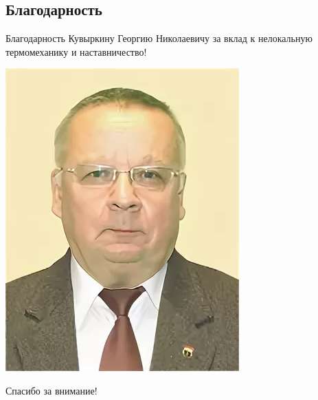 \subsection{Благодарность}
\begin{frame}{Благодарность}
	\justifying
	Кувыркину Георгию Николаевичу за вклад к нелокальную термомеханику и наставничество!
	\begin{center}
		\includegraphics[height=0.65\textheight]{pics/Kuvyrkin.png}
	\end{center}
\end{frame}

\begin{frame} %
    \begin{center}
        \Huge
        Спасибо за внимание!
    \end{center}
\end{frame}

